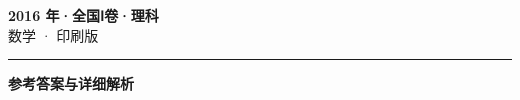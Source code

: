 \documentclass[zihao=5, a4paper]{ctexart}
\begin{document}
\begin{center}
  {\Large\bfseries 2016 年·全国Ⅰ卷·理科}\\[4pt]
  {\large 数学 · 印刷版}
\end{center}
\medskip
{}

\par\bigskip\hrule\bigskip
{}
\begin{center}{\large\bfseries 参考答案与详细解析}\end{center}
\smallskip

\end{document}
